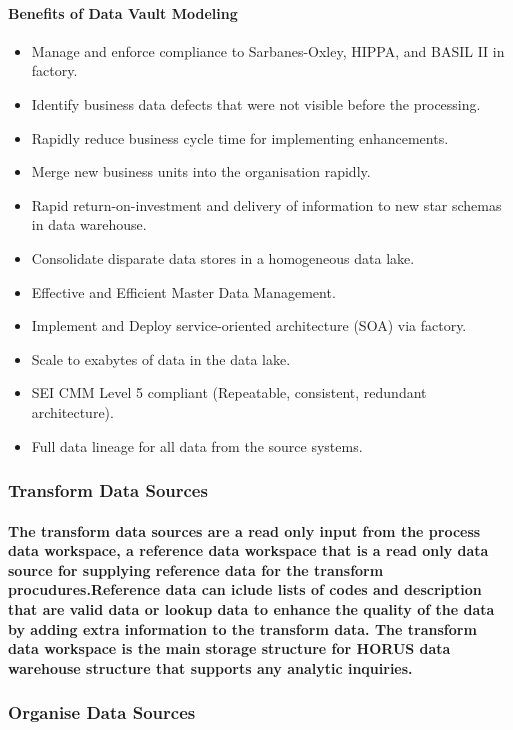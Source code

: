 \documentclass{acm_proc_article-sp}
\begin{document}
\paragraph{Benefits of Data Vault Modeling}
\begin{itemize}
\item Manage and enforce compliance to Sarbanes-Oxley, HIPPA, and BASIL II in factory.
\item Identify business data defects that were not visible before the processing.
\item Rapidly reduce business cycle time for implementing enhancements.
\item Merge new business units into the organisation rapidly.
\item Rapid return-on-investment and delivery of information to new star schemas in data warehouse.
\item Consolidate disparate data stores in a homogeneous data lake.
\item Effective and Efficient Master Data Management.
\item Implement and Deploy service-oriented architecture (SOA) via factory.
\item Scale to exabytes of data in the data lake.
\item SEI CMM Level 5 compliant (Repeatable, consistent, redundant architecture).
\item Full data lineage for all data from the source systems.
\end{itemize}
\subsubsection{Transform Data Sources}
\paragraph{The transform data sources are a read only input from the process data workspace, a reference data workspace that is a read only data source for supplying reference data for the transform procudures.Reference data can iclude lists of codes and description that are valid data or lookup data to enhance the quality of the data by adding extra information to the transform data. The transform data workspace is the main storage structure for HORUS data warehouse structure that supports any analytic inquiries.}
\subsubsection{Organise Data Sources}
\end{document}
